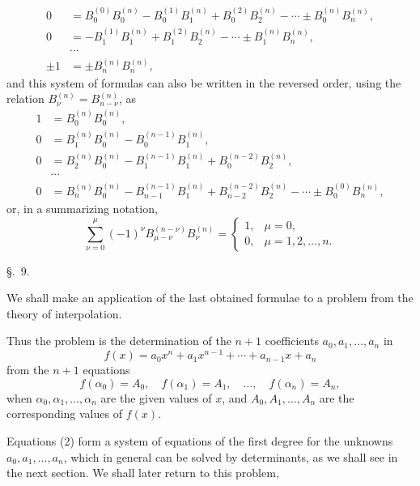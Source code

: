 
\begin{equation}
\begin{aligned}
0&=B_0^{(0)}B_0^{(n)}-B_0^{(1)}B_1^{(n)}+B_0^{(2)}B_2^{(n)}-\cdots\pm B_0^{(n)}B_n^{(n)},\\
0&=-B_1^{(1)}B_1^{(n)}+B_1^{(2)}B_2^{(n)}-\cdots\pm B_1^{(n)}B_n^{(n)},\\
&\cdots\\
\pm 1&=\pm B_n^{(n)}B_n^{(n)},
\end{aligned}
\tag{6}
\end{equation}
and this system of formulas can also be written in the reversed order, using the relation $B_\nu^{(n)}=B_{n-\nu}^{(n)}$, as
\begin{equation}
\begin{aligned}
1&=B_0^{(n)}B_0^{(n)},\\
0&=B_1^{(n)}B_0^{(n)}-B_0^{(n-1)}B_1^{(n)},\\
0&=B_2^{(n)}B_0^{(n)}-B_1^{(n-1)}B_1^{(n)}+B_0^{(n-2)}B_2^{(n)},\\
&\cdots\\
0&=B_n^{(n)}B_0^{(n)}-B_{n-1}^{(n-1)}B_1^{(n)}+B_{n-2}^{(n-2)}B_2^{(n)}-\cdots\pm B_0^{(0)}B_n^{(n)},
\end{aligned}
\tag{7}
\end{equation}
or, in a summarizing notation,
\begin{equation}
 \sum_{\nu=0}^{\mu}(-1)^\nu B_{\mu-\nu}^{(n-\nu)}B_\nu^{(n)}
 =\begin{cases}
 1,&\mu=0,\\
 0,&\mu=1,2,\ldots,n.
 \end{cases}
\tag{8}
\end{equation}


\begin{center}
{\large \S.\ 9.}

\vspace{0.5em}
{\large{}}
\end{center}

We shall make an application of the last obtained formulae to a problem from the theory of interpolation.


Thus the problem is the determination of the $n+1$ coefficients $a_0,a_1,\ldots,a_n$ in
\begin{equation}
 f(x)=a_0x^n+a_1x^{n-1}+\cdots+a_{n-1}x+a_n
\tag{1}
\end{equation}
from the $n+1$ equations
\begin{equation}
 f(\alpha_0)=A_0,\quad f(\alpha_1)=A_1,\quad \ldots,\quad f(\alpha_n)=A_n,
\tag{2}
\end{equation}
when $\alpha_0,\alpha_1,\ldots,\alpha_n$ are the given values of $x$, and $A_0,A_1,\ldots,A_n$ are the corresponding values of $f(x)$.

Equations (2) form a system of equations of the first degree for the unknowns $a_0,a_1,\ldots,a_n$, which in general can be solved by determinants, as we shall see in the next section. We shall later return to this problem,
